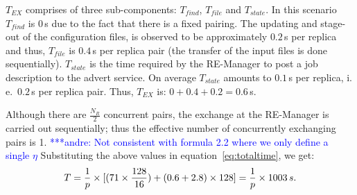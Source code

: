 \documentclass{rspublic}
\newcommand{\jhanote}[1]{ {\textcolor{red} { ***shantenu: #1 }}}
\newcommand{\alnote}[1]{ {\textcolor{blue} { ***andre: #1 }}}
\newcommand{\athotanote}[1]{ {\textcolor{green} { ***athota: #1 }}}
\newcommand{\alnote}[1]{}
\newcommand{\athotanote}[1]{}
\newcommand{\jhanote}[1]{}
\begin{document}




$T_{EX}$ comprises of three sub-components: $T_{find}$, $T_{file}$ and
$T_{state}$. In this scenario $T_{find}$ is $0$\,s due to the fact that there
is a fixed pairing. The updating and stage-out of the configuration
files, is observed to be approximately $0.2$\,s per replica and thus,
$T_{file}$ is $0.4$\,s per replica pair (the transfer of the input files is
done sequentially). 
$T_{state}$ is the time required by the RE-Manager to post a job
description to the advert service. On average $T_{state}$ amounts to
$0.1$\,s per replica, i.\,e.\ $0.2$\,s per replica pair.
Thus, $T_{EX}$ is: $0+0.4+0.2=0.6$\,s. 

Although there are $\frac{N_R}{2}$ concurrent pairs, the exchange 
at the RE-Manager is carried out sequentially; thus the effective 
number of concurrently exchanging pairs is 1.\alnote{Not consistent 
with formula 2.2 where we only define a single $\eta$} Substituting the above values in
equation~\ref{eq:totaltime}, we get:
\begin{eqnarray}
  T=  {1 \over p} \times {[ {(71\times {128\over 16}})+ (0.6 + 2.8)\times 128]} = {1 \over p} \times 1003\,s.
  \label{eq:sync}
\end{eqnarray}
\end{document}
